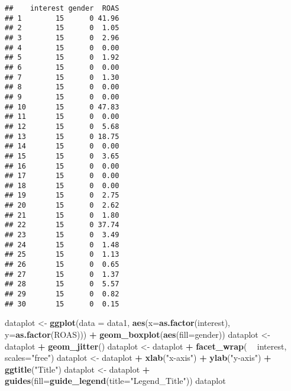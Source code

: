 \documentclass[]{article}
\newenvironment{Shaded}{\begin{snugshade}}{\end{snugshade}}
\newcommand{\KeywordTok}[1]{\textcolor[rgb]{0.13,0.29,0.53}{\textbf{#1}}}
\newcommand{\DataTypeTok}[1]{\textcolor[rgb]{0.13,0.29,0.53}{#1}}
\newcommand{\StringTok}[1]{\textcolor[rgb]{0.31,0.60,0.02}{#1}}
\newcommand{\OperatorTok}[1]{\textcolor[rgb]{0.81,0.36,0.00}{\textbf{#1}}}
\newcommand{\NormalTok}[1]{#1}
\begin{document}
\begin{verbatim}
##    interest gender  ROAS
## 1        15      0 41.96
## 2        15      0  1.05
## 3        15      0  2.96
## 4        15      0  0.00
## 5        15      0  1.92
## 6        15      0  0.00
## 7        15      0  1.30
## 8        15      0  0.00
## 9        15      0  0.00
## 10       15      0 47.83
## 11       15      0  0.00
## 12       15      0  5.68
## 13       15      0 18.75
## 14       15      0  0.00
## 15       15      0  3.65
## 16       15      0  0.00
## 17       15      0  0.00
## 18       15      0  0.00
## 19       15      0  2.75
## 20       15      0  2.62
## 21       15      0  1.80
## 22       15      0 37.74
## 23       15      0  3.49
## 24       15      0  1.48
## 25       15      0  1.13
## 26       15      0  0.65
## 27       15      0  1.37
## 28       15      0  5.57
## 29       15      0  0.82
## 30       15      0  0.15
\end{verbatim}

\begin{Shaded}
\begin{Highlighting}[]
\NormalTok{dataplot <-}\StringTok{ }\KeywordTok{ggplot}\NormalTok{(}\DataTypeTok{data =}\NormalTok{ data1, }\KeywordTok{aes}\NormalTok{(}\DataTypeTok{x=}\KeywordTok{as.factor}\NormalTok{(interest), }\DataTypeTok{y=}\KeywordTok{as.factor}\NormalTok{(ROAS))) }\OperatorTok{+}\StringTok{ }\KeywordTok{geom_boxplot}\NormalTok{(}\KeywordTok{aes}\NormalTok{(}\DataTypeTok{fill=}\NormalTok{gender)) }
\NormalTok{dataplot <-}\StringTok{ }\NormalTok{dataplot }\OperatorTok{+}\StringTok{ }\KeywordTok{geom_jitter}\NormalTok{()}
\NormalTok{dataplot <-}\StringTok{ }\NormalTok{dataplot }\OperatorTok{+}\StringTok{ }\KeywordTok{facet_wrap}\NormalTok{( }\OperatorTok{~}\StringTok{ }\NormalTok{interest, }\DataTypeTok{scales=}\StringTok{"free"}\NormalTok{)}
\NormalTok{dataplot <-}\StringTok{ }\NormalTok{dataplot }\OperatorTok{+}\StringTok{ }\KeywordTok{xlab}\NormalTok{(}\StringTok{"x-axis"}\NormalTok{) }\OperatorTok{+}\StringTok{ }\KeywordTok{ylab}\NormalTok{(}\StringTok{"y-axis"}\NormalTok{) }\OperatorTok{+}\StringTok{ }\KeywordTok{ggtitle}\NormalTok{(}\StringTok{"Title"}\NormalTok{)}
\NormalTok{dataplot <-}\StringTok{ }\NormalTok{dataplot }\OperatorTok{+}\StringTok{ }\KeywordTok{guides}\NormalTok{(}\DataTypeTok{fill=}\KeywordTok{guide_legend}\NormalTok{(}\DataTypeTok{title=}\StringTok{"Legend_Title"}\NormalTok{))}
\NormalTok{dataplot }
\end{Highlighting}
\end{Shaded}
\end{document}
